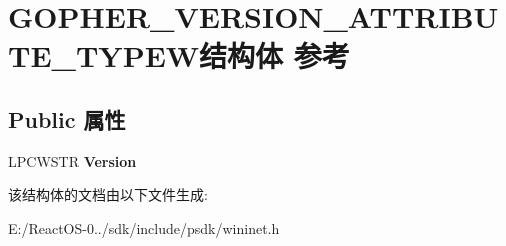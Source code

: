 \hypertarget{struct_g_o_p_h_e_r___v_e_r_s_i_o_n___a_t_t_r_i_b_u_t_e___t_y_p_e_w}{}\section{G\+O\+P\+H\+E\+R\+\_\+\+V\+E\+R\+S\+I\+O\+N\+\_\+\+A\+T\+T\+R\+I\+B\+U\+T\+E\+\_\+\+T\+Y\+P\+E\+W结构体 参考}
\label{struct_g_o_p_h_e_r___v_e_r_s_i_o_n___a_t_t_r_i_b_u_t_e___t_y_p_e_w}
\subsection*{Public 属性}
\begin{DoxyCompactItemize}
\item 
\mbox{\label{struct_g_o_p_h_e_r___v_e_r_s_i_o_n___a_t_t_r_i_b_u_t_e___t_y_p_e_w_acea74f80b89d1296dd886c9154946fb0}} 
L\+P\+C\+W\+S\+TR {\bfseries Version}
\end{DoxyCompactItemize}


该结构体的文档由以下文件生成\+:\begin{DoxyCompactItemize}
\item 
E\+:/\+React\+O\+S-\/0../sdk/include/psdk/wininet.\+h\end{DoxyCompactItemize}
